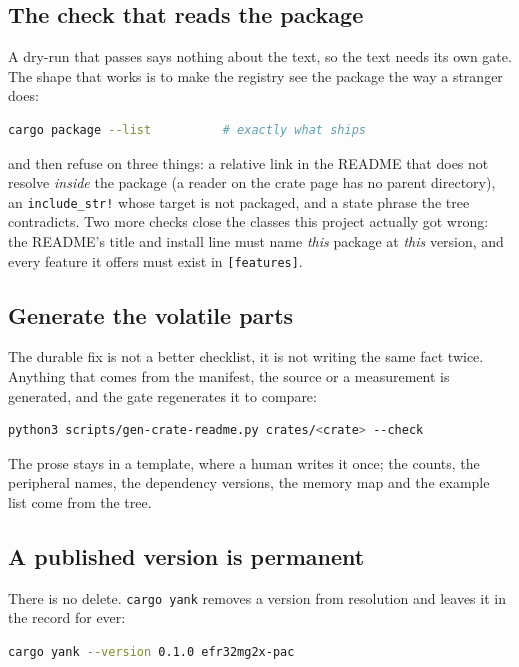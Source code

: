 \subsection{The check that reads the package}

A dry-run that passes says nothing about the text, so the text needs its own gate. The shape that works is to make the
registry see the package the way a stranger does:

\begin{lstlisting}[language=bash]
cargo package --list          # exactly what ships
\end{lstlisting}

and then refuse on three things: a relative link in the README that does not resolve \emph{inside} the package (a
reader on the crate page has no parent directory), an \texttt{include\_str!} whose target is not packaged, and a state
phrase the tree contradicts. Two more checks close the classes this project actually got wrong: the README's title and
install line must name \emph{this} package at \emph{this} version, and every feature it offers must exist in
\texttt{[features]}.

\subsection{Generate the volatile parts}

The durable fix is not a better checklist, it is not writing the same fact twice. Anything that comes from the
manifest, the source or a measurement is generated, and the gate regenerates it to compare:

\begin{lstlisting}[language=bash]
python3 scripts/gen-crate-readme.py crates/<crate> --check
\end{lstlisting}

The prose stays in a template, where a human writes it once; the counts, the peripheral names, the dependency versions,
the memory map and the example list come from the tree.

\subsection{A published version is permanent}

There is no delete. \texttt{cargo yank} removes a version from resolution and leaves it in the record for ever:

\begin{lstlisting}[language=bash]
cargo yank --version 0.1.0 efr32mg2x-pac
\end{lstlisting}

